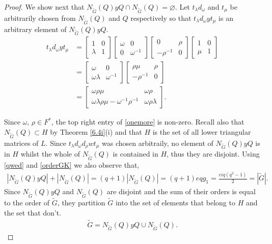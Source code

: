 \documentclass[a4paper , 11pt]{book}
\theoremstyle{definition}
\theoremstyle{remark}
\begin{document}
\begin{proof}
We show next that $N_{\widetilde{G}}(Q) y Q \cap N_{\widetilde{G}}(Q) = \varnothing$. Let $t_\lambda d_\omega$ and $t_\mu$ be arbitrarily chosen from $N_{\widetilde{G}}(Q)$ and $Q$ respectively so that $t_\lambda d_\omega y t_\mu$ is an arbitrary element of $N_{\widetilde{G}}(Q) y Q$.
\begin{align}\label{onemore} t_\lambda d_\omega y t_\mu &= \begin{bmatrix} 1 & 0 \\ \lambda & 1 \end{bmatrix} \begin{bmatrix} \omega & 0 \\ 0 & \omega^{-1} \end{bmatrix} \begin{bmatrix} 0 & \rho \\ -\rho^{-1} & 0 \end{bmatrix}  \begin{bmatrix} 1 & 0 \\ \mu & 1 \end{bmatrix} \nonumber
\\[1.5ex] &= \begin{bmatrix} \omega & 0 \\ \omega \lambda & \omega^{-1} \end{bmatrix} \begin{bmatrix} \rho \mu & \rho \\ -\rho^{-1} & 0 \end{bmatrix} \nonumber
\\[1.5ex] &= \begin{bmatrix} \omega \rho \mu & \omega \rho  \\ \omega \lambda \rho \mu - \omega^{-1} \rho^{-1} & \omega \rho \lambda \end{bmatrix}.
\end{align}

Since $\omega$, $\rho \in F^*$, the top right entry of \eqref{onemore} is non-zero. Recall also that $N_{\widetilde{G}}(Q) \subset H$ by Theorem \ref{6.4i}(i) and that $H$ is the set of all lower triangular matrices of $L$. Since $t_\lambda d_\omega d_\rho w t_\mu$ was chosen arbitraily, no element of $N_{\widetilde{G}}(Q) y Q$ is in $H$ whilst the whole of $N_{\widetilde{G}}(Q)$ is contained in $H$, thus they are disjoint. Using \eqref{qwed} and \eqref{orderGK} we also observe that,
\begin{align*} |N_{\widetilde{G}}(Q) y Q| + |N_{\widetilde{G}}(Q)| = (q+1)|N_{\widetilde{G}}(Q)| = (q+1)eqg_1 = \frac{eiq(q^2-1)}{2} = |{\widetilde{G}}|.
\end{align*}
Since $N_{\widetilde{G}}(Q) y Q$ and $N_{\widetilde{G}}(Q)$ are disjoint and the sum of their orders is equal to the order of ${\widetilde{G}}$, they partition ${\widetilde{G}}$ into the set of elements that belong to $H$ and the set that don't.
\begin{align}\label{gsplit} {\widetilde{G}} = N_{\widetilde{G}}(Q) y Q \cup N_{\widetilde{G}}(Q).
\end{align}


\end{proof}
\end{document}
